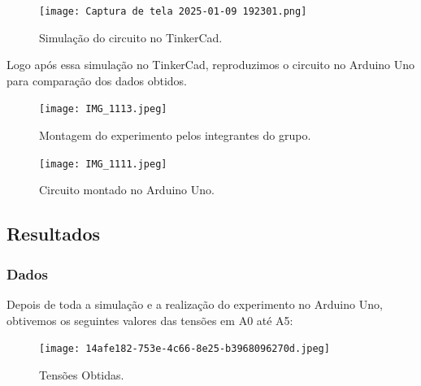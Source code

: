 \documentclass[a4paper,12pt]{article}
\begin{document}
\begin{figure}[H]
    \centering
    \texttt{[image: Captura de tela 2025-01-09 192301.png]} %
    \caption{Simulação do circuito no TinkerCad.}
    \label{fig:tinkercad}
\end{figure}

\vspace{1em}

Logo após essa simulação no TinkerCad, reproduzimos o circuito no Arduino Uno para comparação dos dados obtidos.

\vspace{1em}

\begin{figure}[H]
    \centering
    \texttt{[image: IMG\_1113.jpeg]} %
    \caption{Montagem do experimento pelos integrantes do grupo.}
    \label{fig:arduino}
\end{figure}

\vspace{1em}


\begin{figure}[H]
    \centering
    \texttt{[image: IMG\_1111.jpeg]} %
    \caption{Circuito montado no Arduino Uno.}
    \label{fig:arduino}
\end{figure}

\vspace{1em}

\subsection{Resultados}
\subsubsection{Dados}
\leavevmode

Depois de toda a simulação e a realização do experimento no Arduino Uno, obtivemos os seguintes valores das tensões em A0 até A5:

\vspace{1em}

\begin{figure}[H]
    \centering
    \texttt{[image: 14afe182-753e-4c66-8e25-b3968096270d.jpeg]} %
    \caption{Tensões Obtidas.}
    \label{fig:arduino}
\end{figure}
\end{document}
